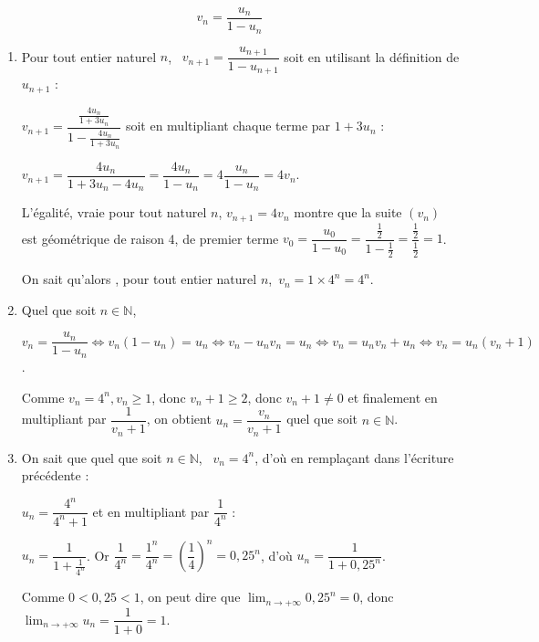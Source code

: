 \documentclass[10pt]{article}
\providecommand{\N}{\mathbb{N}}
\begin{document}
\begin{enumerate}
\[v_n  = \dfrac{u_n}{1 - u_n}\]

	\begin{enumerate}
		\item 

Pour tout entier naturel $n$, \, $v_{n+1}  = \dfrac{u_{n+1}}{1 - u_{n+1}}$ soit en utilisant la définition de $u_{n+1}$ :

$v_{n+1}  = \dfrac{\frac{4u_n}{1 + 3u_n}}{1 - \frac{4u_n}{1 + 3u_n}}$ soit en multipliant chaque terme par $1 + 3u_n$ :

$v_{n+1} = \dfrac{4u_n}{1 + 3u_n - 4u_n} = \dfrac{4u_n}{1 - u_n} = 4\dfrac{u_n}{1 - u_n} = 4v_n$.

L'égalité, vraie pour tout naturel $n$, $v_{n+1} = 4v_n$ montre que la suite $\left(v_n\right)$ est géométrique de raison 4, de premier terme $v_0 = \dfrac{u_0}{1 - u_0} = \dfrac{\frac{1}{2}}{1 - \frac{1}{2}} = \dfrac{\frac{1}{2}}{\frac{1}{2}} = 1$.
	

On sait qu'alors , pour tout entier naturel $n$,\, $v_n = 1 \times 4^n = 4^n$.
		\item 
Quel que soit $n \in \N$,

$v_n  = \dfrac{u_n}{1 - u_n}\iff v_n\left( 1 - u_n\right) = u_n \iff v_n - u_nv_n = u_n \iff v_n = u_nv_n + u_n \iff v_n = u_n\left(v_n + 1 \right)$.

Comme $v_n = 4^n, v_n \geqslant 1$, donc $v_n + 1 \geqslant 2$, donc $v_n + 1 \ne 0$ et finalement en multipliant par $\dfrac{1}{v_n + 1}$, on obtient $u_n = \dfrac{v_n}{v_n + 1}$ quel que soit $n \in \N$.
		\item 
		

On sait que quel que soit $n \in \N$, \, $v_n = 4^n$, d'où en remplaçant dans l'écriture précédente :

$u_n = \dfrac{4^n}{4^n +1}$ et en multipliant par $\dfrac{1}{4^n}$ :

$u_n = \dfrac{1}{1 + \frac{1}{4^n}}$. Or $\dfrac{1}{4^n} = \dfrac{1^n}{4^n} = \left(\dfrac{1}{4}\right)^n = 0,25^n$, d'où $u_n = \dfrac{1}{1 + 0,25^n}$.



Comme $0 < 0,25 < 1$, on peut dire que $\displaystyle\lim_{n \to + \infty} 0,25^n = 0$, donc $\displaystyle\lim_{n \to + \infty}  u_n = \dfrac{1}{1+0} = 1$.
	\end{enumerate}
\end{enumerate}
\end{document}
